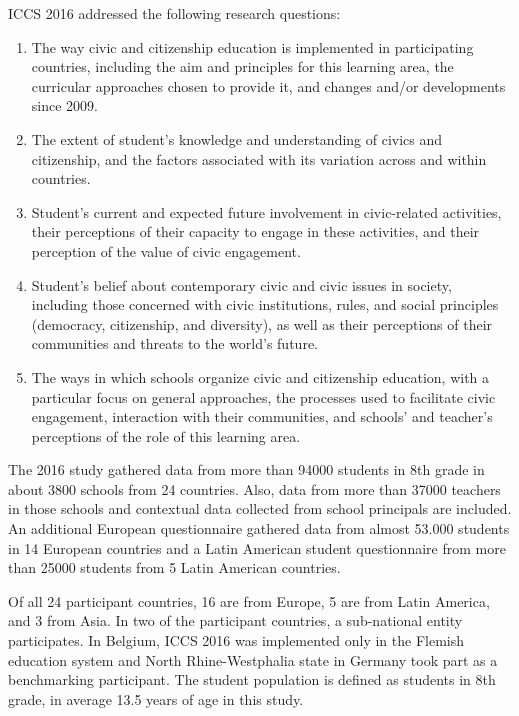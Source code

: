 \documentclass[12pt,a4paper,oneside]{reedthesis}
\providecommand{\tightlist}{%
  \setlength{\itemsep}{0pt}\setlength{\parskip}{0pt}}
\begin{document}
ICCS 2016 addressed the following research questions:
\begin{enumerate}
\def\labelenumi{\arabic{enumi}.}
\tightlist
\item
  The way civic and citizenship education is implemented in participating countries, including the aim and principles for this learning area, the curricular approaches chosen to provide it, and changes and/or developments since 2009.\\
\item
  The extent of student's knowledge and understanding of civics and citizenship, and the factors associated with its variation across and within countries.\\
\item
  Student's current and expected future involvement in civic-related activities, their perceptions of their capacity to engage in these activities, and their perception of the value of civic engagement.\\
\item
  Student's belief about contemporary civic and civic issues in society, including those concerned with civic institutions, rules, and social principles (democracy, citizenship, and diversity), as well as their perceptions of their communities and threats to the world's future.\\
\item
  The ways in which schools organize civic and citizenship education, with a particular focus on general approaches, the processes used to facilitate civic engagement, interaction with their communities, and schools' and teacher's perceptions of the role of this learning area.
\end{enumerate}
The 2016 study gathered data from more than 94000 students in 8th grade in about 3800 schools from 24 countries. Also, data from more than 37000 teachers in those schools and contextual data collected from school principals are included. An additional European questionnaire gathered data from almost 53.000 students in 14 European countries and a Latin American student questionnaire from more than 25000 students from 5 Latin American countries.

Of all 24 participant countries, 16 are from Europe, 5 are from Latin America, and 3 from Asia. In two of the participant countries, a sub-national entity participates. In Belgium, ICCS 2016 was implemented only in the Flemish education system and North Rhine-Westphalia state in Germany took part as a benchmarking participant. The student population is defined as students in 8th grade, in average 13.5 years of age in this study.
\end{document}
